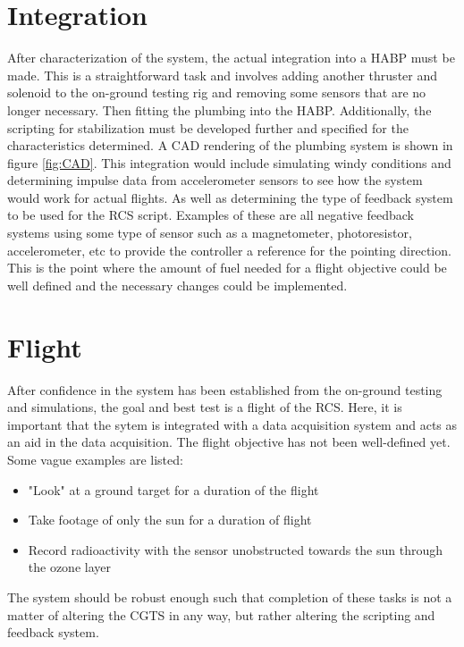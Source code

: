 \section{Integration}
After characterization of the system, the actual integration into a HABP must be made. This is a straightforward task and involves adding another thruster and solenoid to the on-ground testing rig and removing some sensors that are no longer necessary. Then fitting the plumbing into the HABP. Additionally, the scripting for stabilization must be developed further and specified for the characteristics determined. A CAD rendering of the plumbing system is shown in figure \ref{fig:CAD}.
This integration would include simulating windy conditions and determining impulse data from accelerometer sensors to see how the system would work for actual flights. As well as determining the type of feedback system to be used for the RCS script. Examples of these are all negative feedback systems using some type of sensor such as a magnetometer, photoresistor, accelerometer, etc to provide the controller a reference for the pointing direction. This is the point where the amount of fuel needed for a flight objective could be well defined and the necessary changes could be implemented.
\section{Flight}
After confidence in the system has been established from the on-ground testing and simulations, the goal and best test is a flight of the RCS. Here, it is important that the sytem is integrated with a data acquisition system and acts as an aid in the data acquisition. The flight objective has not been well-defined yet. Some vague examples are listed:
\begin{itemize}
\item "Look" at a ground target for a duration of the flight
\item Take footage of only the sun for a duration of flight
\item Record radioactivity with the sensor unobstructed towards the sun through the ozone layer
\end{itemize}
The system should be robust enough such that completion of these tasks is not a matter of altering the CGTS in any way, but rather altering the scripting and feedback system. 